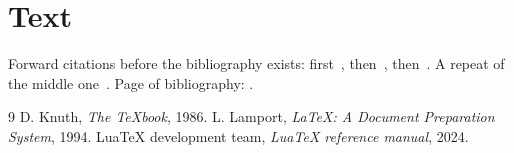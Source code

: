 \documentclass{article}
\begin{document}
\section{Text}\label{sec:text}
Forward citations before the bibliography exists: first~\cite{knuth},
then~\cite{lamport}, then~\cite{luatex}.  A repeat of the middle
one~\cite{lamport}.  Page of bibliography: \pageref{sec:bib}.

\begin{thebibliography}{9}\label{sec:bib}
 D. Knuth, \emph{The \TeX book}, 1986.
 L. Lamport, \emph{\LaTeX: A Document Preparation System}, 1994.
 LuaTeX development team, \emph{LuaTeX reference manual}, 2024.
\end{thebibliography}
\end{document}
